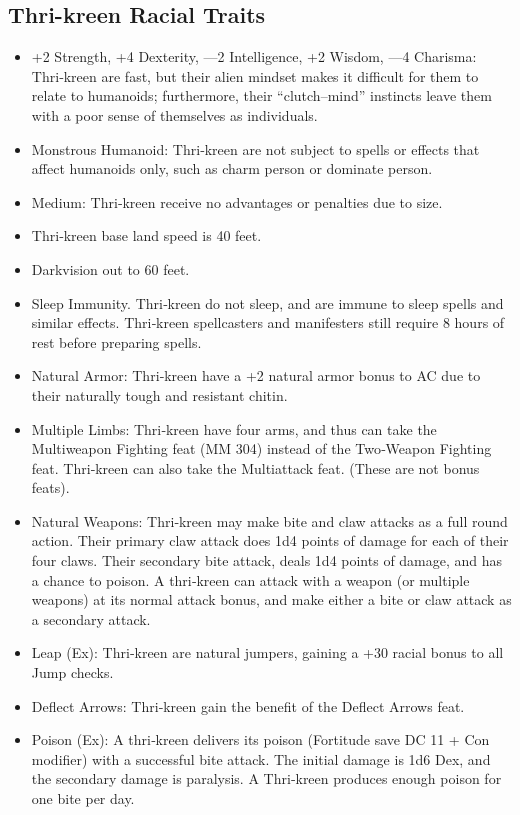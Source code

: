 \subsection{Thri-kreen Racial Traits}
\begin{itemize}
    \item +2 Strength, +4 Dexterity, —2 Intelligence, +2 Wisdom, —4 Charisma: Thri‐kreen are fast, but their alien mindset makes it difficult for them to relate to humanoids; furthermore, their “clutch–mind” instincts leave them with a poor sense of themselves as individuals.
    \item Monstrous Humanoid: Thri‐kreen are not subject to spells or effects that affect humanoids only, such as charm person or dominate person.
    \item Medium: Thri‐kreen receive no advantages or penalties due to size.
    \item Thri‐kreen base land speed is 40 feet.
    \item Darkvision out to 60 feet.
    \item Sleep Immunity. Thri‐kreen do not sleep, and are immune to sleep spells and similar effects. Thri‐kreen spellcasters and manifesters still require 8 hours of rest before preparing spells.
    \item Natural Armor: Thri‐kreen have a +2 natural armor bonus to AC due to their naturally tough and resistant chitin.
    \item Multiple Limbs: Thri‐kreen have four arms, and thus can take the Multiweapon Fighting feat (MM 304) instead of the Two‐Weapon Fighting feat. Thri‐kreen can also take the Multiattack feat. (These are not bonus feats).
    \item Natural Weapons: Thri‐kreen may make bite and claw attacks as a full round action. Their primary claw attack does 1d4 points of damage for each of their four claws. Their secondary bite attack, deals 1d4 points of damage, and has a chance to poison. A thri‐kreen can attack with a weapon (or multiple weapons) at its normal attack bonus, and make either a bite or claw attack as a secondary attack.
    \item Leap (Ex): Thri‐kreen are natural jumpers, gaining a +30 racial bonus to all Jump checks.
    \item Deflect Arrows: Thri‐kreen gain the benefit of the Deflect Arrows feat.
    \item Poison (Ex): A thri‐kreen delivers its poison (Fortitude save DC 11 + Con modifier) with a successful bite attack. The initial damage is 1d6 Dex, and the secondary damage is paralysis. A Thri‐kreen produces enough poison for one bite per day.

\end{itemize}
